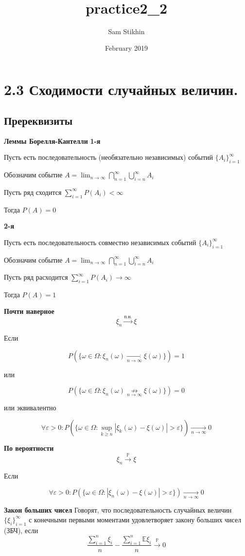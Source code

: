 \documentclass[a4paper, 14pt]{extarticle}
\title{practice2_2}
\author{Sam Stikhin}
\date{February 2019}
\begin{document}
\section*{2.3 Сходимости случайных величин.}
\subsection*{Пререквизиты}
\textbf{Леммы Борелля-Кантелли}
\textbf{1-я}

Пусть есть последовательность (необязательно независимых) событий $\{A_i\}_{i=1}^{\infty}$

Обозначим событие $A = \lim_{n\to \infty}\bigcap_{n=1}^{\infty}\bigcup_{i=n}^{\infty}A_i$

Пусть ряд сходится $\sum_{i=1}^{\infty}P(A_i) < \infty$

Тогда $P(A) = 0$

\textbf{2-я}

Пусть есть последовательность совместно независимых событий $\{A_i\}_{i=1}^{\infty}$

Обозначим событие $A = \lim_{n\to \infty}\bigcap_{n=1}^{\infty}\bigcup_{i=n}^{\infty}A_i$

Пусть ряд расходится $\sum_{i=1}^{\infty}P(A_i) \to \infty$

Тогда $P(A) = 1$

\textbf{Почти наверное}
$$\xi_n \overset{\textrm{п.н.}}{\to} \xi$$

Если

$$P(\{ \omega \in \Omega : \xi_n(\omega) \underset{n \to \infty}{\to} \xi(\omega) \}) = 1$$ 

или

$$P(\{ \omega \in \Omega : \xi_n(\omega) \underset{n \to \infty}{\not\to} \xi(\omega) \}) = 0$$ 

или эквивалентно

$$\forall \varepsilon > 0 : P(\{ \omega \in \Omega : \sup_{k \geq n} |\xi_k(\omega)-\xi(\omega)| > \varepsilon \}) \underset{n \to \infty}{\to} 0$$

\textbf{По вероятности}
$$\xi_n \overset{\mathbb{P}}{\to} \xi$$ 

Если

$$\forall \varepsilon > 0 : P(\{\omega \in \Omega : |\xi_n(\omega)-\xi(\omega)| > \varepsilon \}) \underset{n \to \infty}{\to} 0$$

\textbf{Закон больших чисел}
Говорят, что последовательность случайных величин $\{\xi_i\}_{i=1}^{\infty}$ с конечными первыми моментами удовлетворяет закону больших чисел (ЗБЧ), если
$$\frac{\sum_{i=1}^n\xi_i}{n} - \frac{\sum_{i=1}^n\mathbb{E}\xi_i}{n} \overset{\mathbb{P}}{\to} 0$$
	
\end{document}
